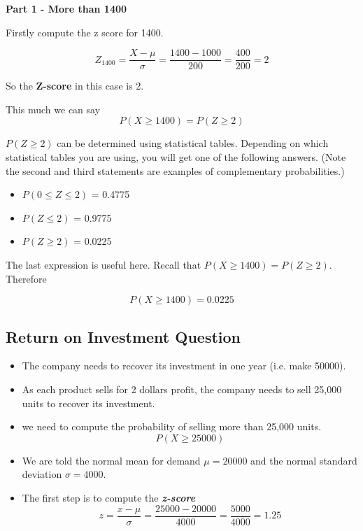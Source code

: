 \documentclass[]{report}
\begin{document}
\noindent \textbf{Part 1 -  More than 1400}

Firstly compute the z score for 1400.

\[ Z_{1400} =  \frac{X - \mu}{\sigma} = \frac{1400 - 1000}{200} = \frac{400}{200} = 2  \]

So the \textbf{Z-score} in this case is 2.

This much we can say
\[P(X \geq 1400) = P(Z \geq 2)\]

$P(Z \geq 2)$ can be determined using statistical tables.
Depending on which statistical tables you are using, you will get one of the following answers. (Note the 
second and third statements are examples of complementary probabilities.)
\begin{itemize}
	\item $P (0 \leq Z \leq 2)$ = 0.4775
	\item $P ( Z \leq 2)$ = 0.9775
	\item $P ( Z \geq 2)$ = 0.0225
\end{itemize}
The last expression is useful here. Recall that $P(X \geq 1400) = P(Z \geq 2)$. Therefore

\[P(X \geq 1400) = 0.0225\]


\subsection*{Return on Investment Question}

\begin{itemize}
	\item The company needs to recover its investment in one year (i.e. make 50000).
	\item As each product sells for 2 dollars profit, the company needs to sell 25,000 units to recover its investment.
	\item we need to compute the probability of selling more than 25,000 units.
	\[P(X \geq 25000) \]
	\item We are told the normal mean for demand $\mu =20000$ and the normal standard deviation $\sigma = 4000$.
	\item The first step is to compute the \textbf{\textit{z-score}}
	\[ z = \frac{x - \mu}{\sigma}  = \frac{25000 - 20000}{4000} = \frac{5000}{4000} = 1.25\]
\end{itemize}
\end{document}
